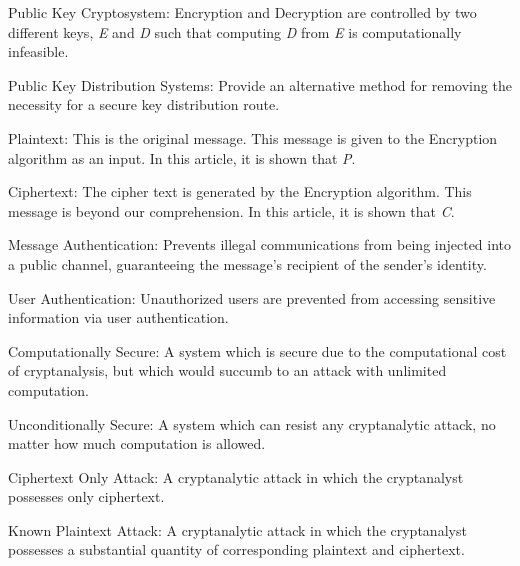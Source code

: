\documentclass{article}
\begin{document}
\begin{flushleft}
\hspace{0.5cm} Public Key Cryptosystem: Encryption and Decryption are controlled by two different keys, \textit{E} and \textit{D} such that computing \textit{D} from \textit{E} is computationally infeasible.\newline

\hspace{0.5cm} Public Key Distribution Systems: Provide an alternative method for removing the necessity for a secure key distribution route. \newline

\hspace{0.5cm} Plaintext: This is the original message. This message is given to the Encryption algorithm as an input. In this article, it is shown that \textit{P}.\newline

\hspace{0.5cm} Ciphertext: The cipher text is generated by the Encryption algorithm. This message is beyond our comprehension. In this article, it is shown that \textit{C}.\newline

\hspace{0.5cm} Message Authentication: Prevents illegal communications from being injected into a public channel, guaranteeing the message's recipient of the sender's identity. \newline

\hspace{0.5cm} User Authentication: Unauthorized users are prevented from accessing sensitive information via user authentication. \newline

\hspace{0.5cm} Computationally Secure: A system which is secure due to the computational cost of cryptanalysis, but which would succumb to an attack with unlimited computation. \newline

\hspace{0.5cm} Unconditionally Secure: A system which can resist any cryptanalytic attack, no matter how much computation is allowed. \newline

\hspace{0.5cm} Ciphertext Only Attack: A cryptanalytic attack in
which the cryptanalyst possesses only ciphertext. \newline

\hspace{0.5cm} Known Plaintext Attack: A cryptanalytic attack in
which the cryptanalyst possesses a substantial quantity
of corresponding plaintext and ciphertext. \newline


\end{flushleft}
\end{document}

